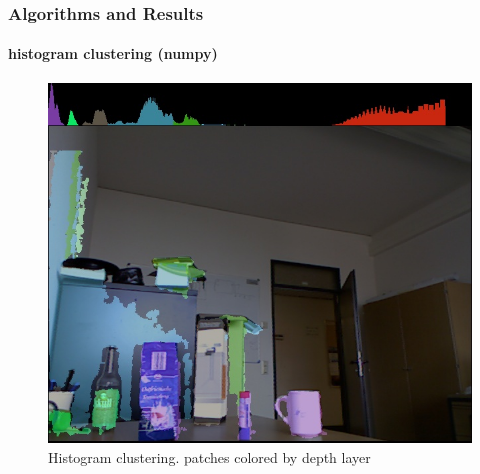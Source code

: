 \documentclass[]{beamer}
\begin{document}
\begin{frame}
    \frametitle{Algorithms and Results}
    \framesubtitle{histogram clustering (numpy)}
    \begin{figure}[h]
        \centering
            \includegraphics[height=0.6\textheight]{../images/cluster_bli_erode.jpg}
        \caption{Histogram clustering. patches colored by depth layer}
        \label{sg:fig:images_cluster_bli_erode}
    \end{figure}
\end{frame}
\end{document}
